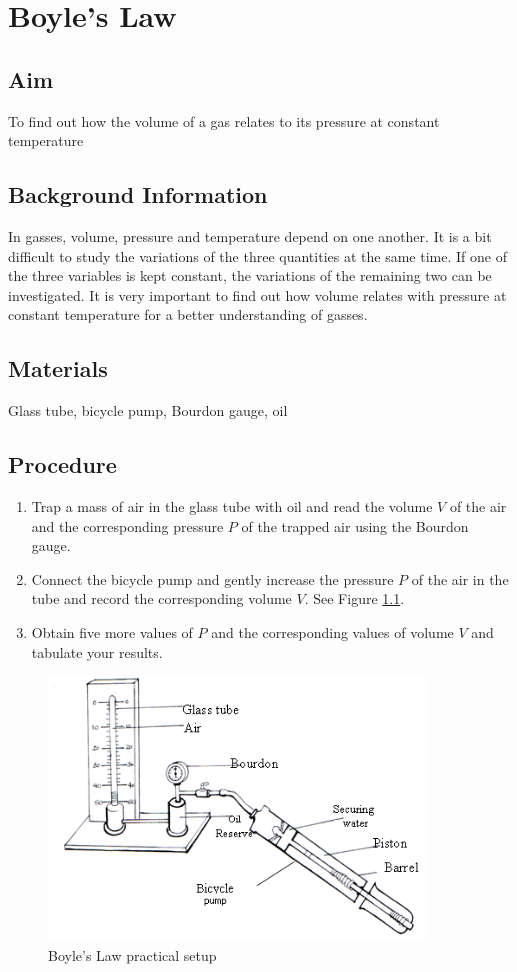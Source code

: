 \chapter{Boyle's Law}

\section{Aim}
To find out how the volume of a gas relates to its pressure at constant temperature

\section{Background Information}
In gasses, volume, pressure and temperature depend on one another. It is a bit difficult to study the variations of the three quantities at the same time. If one of the three variables is kept constant, the variations of the remaining two can be investigated. It is very important to find out how volume relates with pressure at constant temperature for a better understanding of gasses.

\section{Materials}
Glass tube, bicycle pump, Bourdon gauge, oil

\section{Procedure}
\begin{enumerate}
\item Trap a mass of air in the glass tube with oil and read the volume $V$ of the air and the corresponding pressure $P$ of the trapped air using the Bourdon gauge.
\item Connect the bicycle pump and gently increase the pressure $P$ of the air in the tube and record the corresponding volume $V$. See Figure \ref{fig:boyles-law-1}.
\item Obtain five more values of $P$ and the corresponding values of volume $V$ and tabulate your results.
\end{enumerate}

\begin{figure}[h!]
\centering
\includegraphics[width=10cm]{./img/boyles-law-1.png}
\caption{Boyle's Law practical setup}
\label{fig:boyles-law-1}
\end{figure}


